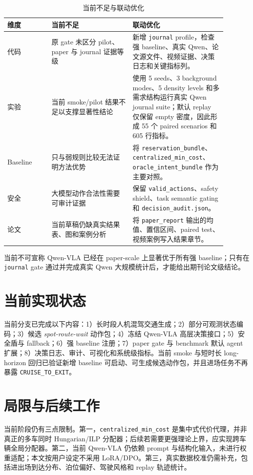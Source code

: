 \documentclass[conference]{IEEEtran}
\begin{document}
\begin{table}[htbp]
\caption{当前不足与联动优化}
\label{tab:readiness}
\centering
\begin{tabular}{p{0.18\linewidth}p{0.33\linewidth}p{0.38\linewidth}}
\toprule
维度 & 当前不足 & 联动优化 \\
\midrule
代码 & 原 gate 未区分 pilot、paper 与 journal 证据等级 & 新增 \texttt{journal} profile，检查强 baseline、真实 Qwen、论文源文件、视频证据、决策日志和关键指标列。 \\
实验 & 当前 smoke/pilot 结果不足以支撑显著性结论 & 使用 5 seeds、3 background modes、5 density levels 和多需求结构运行真实 Qwen journal suite；默认 replay 仅保留 empty 密度，因此形成 55 个 paired scenarios 和 605 行指标。 \\
Baseline & 只与弱规则比较无法证明方法优势 & 将 \texttt{reservation\_bundle}、\texttt{centralized\_min\_cost}、\texttt{oracle\_intent\_bundle} 作为主要对照。 \\
安全 & 大模型动作合法性需要可审计证据 & 保留 \texttt{valid\_actions}、safety shield、task semantic gating 和 \texttt{decision\_audit.json}。 \\
论文 & 当前草稿仍缺真实结果表、图和案例分析 & 将 \texttt{paper\_report} 输出的均值、置信区间、paired test、视频案例写入结果章节。 \\
\bottomrule
\end{tabular}
\end{table}

当前不可宣称 Qwen-VLA 已经在 paper-scale 上显著优于所有强 baseline；只有在 \texttt{journal} gate 通过并完成真实 Qwen 大规模统计后，才能给出期刊论文级结论。

\section{当前实现状态}
当前分支已完成以下内容：1）长时段人机混驾交通生成；2）部分可观测状态编码；3）候选 \emph{spot-route-wait} 动作包；4）冻结 Qwen-VLA 高层决策接口；5）安全盾与 fallback；6）强 baseline 注册；7）paper gate 与 benchmark 默认 agent 扩展；8）决策日志、审计、可视化和系统级指标。当前 smoke 与短时长 long-horizon 回归已验证新增 baseline 可启动、可生成候选动作包，并且进场任务不再暴露 \texttt{CRUISE\_TO\_EXIT}。

\section{局限与后续工作}
当前阶段仍有三点限制。第一，\texttt{centralized\_min\_cost} 是集中式代价代理，并非真正的多车同时 Hungarian/ILP 分配器；后续若需要更强理论上界，应实现跨车辆全局分配器。第二，当前 Qwen-VLA 仍依赖 prompt 与结构化输入，未进行权重适配；本文按用户设定不采用 LoRA/DPO。第三，真实数据校准仍需补充，包括进出场到达分布、泊位偏好、驾驶风格和 replay 轨迹统计。
\end{document}
